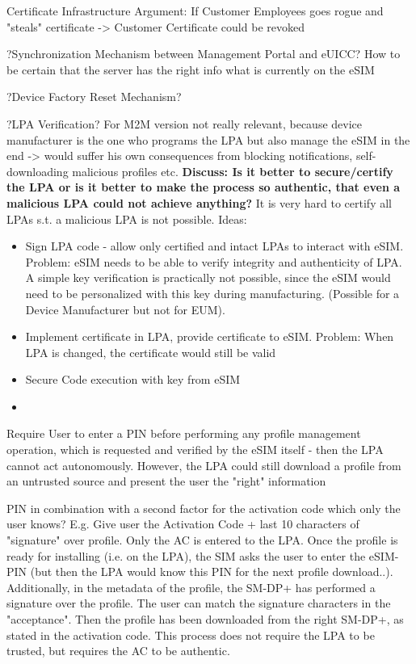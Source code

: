 Certificate Infrastructure Argument: If Customer Employees goes rogue and "steals" certificate -> Customer Certificate could be revoked

?Synchronization Mechanism between Management Portal and eUICC? How to be certain that the server has the right info what is currently on the eSIM

?Device Factory Reset Mechanism? 

?LPA Verification? For M2M version not really relevant, because device manufacturer is the one who programs the LPA but also manage the eSIM in the end -> would suffer his own consequences from blocking notifications, self-downloading malicious profiles etc.
\textbf{Discuss: Is it better to secure/certify the LPA or is it better to make the process so authentic, that even a malicious LPA could not achieve anything?}
It is very hard to certify all LPAs s.t. a malicious LPA is not possible. 
Ideas: 
\begin{itemize}
    \item Sign LPA code - allow only certified and intact LPAs to interact with eSIM. Problem: eSIM needs to be able to verify integrity and authenticity of LPA. A simple key verification is practically not possible, since the eSIM would need to be personalized with this key during manufacturing. (Possible for a Device Manufacturer but not for EUM). 
    \item Implement certificate in LPA, provide certificate to eSIM. Problem: When LPA is changed, the certificate would still be valid
    \item Secure Code execution with key from eSIM
    \item 
\end{itemize}

Require User to enter a PIN before performing any profile management operation, which is requested and verified by the eSIM itself - then the LPA cannot act autonomously. However, the LPA could still download a profile from an untrusted source and present the user the "right" information

PIN in combination with a second factor for the activation code which only the user knows? E.g. Give user the Activation Code + last 10 characters of "signature" over profile. Only the AC is entered to the LPA. Once the profile is ready for installing (i.e. on the LPA), the SIM asks the user to enter the eSIM-PIN (but then the LPA would know this PIN for the next profile download..). Additionally, in the metadata of the profile, the SM-DP+ has performed a signature over the profile. The user can match the signature characters in the "acceptance". Then the profile has been downloaded from the right SM-DP+, as stated in the activation code. This process does not require the LPA to be trusted, but requires the AC to be authentic.

